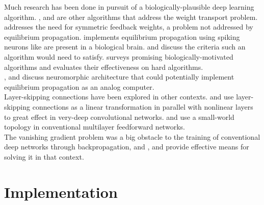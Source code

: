 \documentclass{article}
\newcommand{\npar}{\\\indent}
\begin{document}
Much research has been done in pursuit of a biologically-plausible deep learning algorithm. \cite{lee2015}, \cite{xie2003} and \cite{pineda1987} are other algorithms that address the weight transport problem. \cite{lillicrap2014} addresses the need for symmetric feedback weights, a problem not addressed by equilibrium propagation. \cite{oconnor2018} implements equilibrium propagation using spiking neurons like are present in a biological brain. \cite{bengio2015} and \cite{???} discuss the criteria such an algorithm would need to satisfy. \cite{bartunov2018} surveys promising biologically-motivated algorithms and evaluates their effectiveness on hard algorithms.
\npar
\cite{shainline2019}, \cite{davies2018} and \cite{nahmias2013} discuss neuromorphic architecture that could potentially implement equilibrium propagation as an analog computer.
\npar
Layer-skipping connections have been explored in other contexts. \cite{he2015} and \cite{srivastava2015} use layer-skipping connections as a linear transformation in parallel with nonlinear layers to great effect in very-deep convolutional networks. \cite{xiaohu2011} and \cite{krishnan2019} use a small-world topology in conventional multilayer feedforward networks.
\npar
The vanishing gradient problem was a big obstacle to the training of conventional deep networks through backpropagation, and \cite{ioffe2015}, \cite{glorot2010} and \cite{???} provide effective means for solving it in that context.



\section{Implementation}
\end{document}
